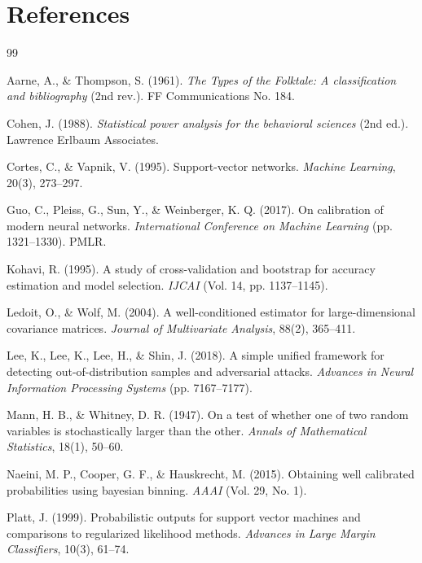 \documentclass{article}
\begin{document}
\medskip

\section*{References}

{
\small

\begin{thebibliography}{99}

Aarne, A., \& Thompson, S. (1961). \textit{The Types of the Folktale: A classification and bibliography} (2nd rev.). FF Communications No. 184.

Cohen, J. (1988). \textit{Statistical power analysis for the behavioral sciences} (2nd ed.). Lawrence Erlbaum Associates.

Cortes, C., \& Vapnik, V. (1995). Support-vector networks. \textit{Machine Learning}, 20(3), 273--297.

Guo, C., Pleiss, G., Sun, Y., \& Weinberger, K. Q. (2017). On calibration of modern neural networks. \textit{International Conference on Machine Learning} (pp. 1321--1330). PMLR.

Kohavi, R. (1995). A study of cross-validation and bootstrap for accuracy estimation and model selection. \textit{IJCAI} (Vol. 14, pp. 1137--1145).

Ledoit, O., \& Wolf, M. (2004). A well-conditioned estimator for large-dimensional covariance matrices. \textit{Journal of Multivariate Analysis}, 88(2), 365--411.

Lee, K., Lee, K., Lee, H., \& Shin, J. (2018). A simple unified framework for detecting out-of-distribution samples and adversarial attacks. \textit{Advances in Neural Information Processing Systems} (pp. 7167--7177).

Mann, H. B., \& Whitney, D. R. (1947). On a test of whether one of two random variables is stochastically larger than the other. \textit{Annals of Mathematical Statistics}, 18(1), 50--60.

Naeini, M. P., Cooper, G. F., \& Hauskrecht, M. (2015). Obtaining well calibrated probabilities using bayesian binning. \textit{AAAI} (Vol. 29, No. 1).

Platt, J. (1999). Probabilistic outputs for support vector machines and comparisons to regularized likelihood methods. \textit{Advances in Large Margin Classifiers}, 10(3), 61--74.


\end{thebibliography}}
\end{document}
